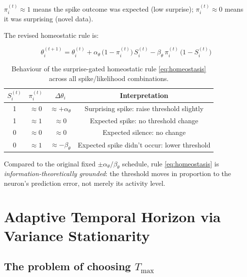 \documentclass[12pt, a4paper]{article}
\begin{document}
$\pi_i^{(t)} \approx 1$ means the spike outcome was expected (low surprise);
$\pi_i^{(t)} \approx 0$ means it was surprising (novel data).

The revised homeostatic rule is:

\begin{equation}
    \boxed{
    \theta_i^{(t+1)} = \theta_i^{(t)}
    + \alpha_\theta\,\bigl(1 - \pi_i^{(t)}\bigr)\, S_i^{(t)}
    - \beta_\theta\,\pi_i^{(t)}\,\bigl(1 - S_i^{(t)}\bigr)
    }
    \label{eq:homeostasis}
\end{equation}

\begin{table}[h]
\centering
\renewcommand{\arraystretch}{1.25}
\begin{tabular}{@{}cccc@{}}
\toprule
$S_i^{(t)}$ & $\pi_i^{(t)}$ & $\Delta\theta_i$ & \textbf{Interpretation} \\
\midrule
1 & $\approx 0$ & $\approx +\alpha_\theta$ & Surprising spike: raise threshold slightly \\
1 & $\approx 1$ & $\approx 0$             & Expected spike: no threshold change \\
0 & $\approx 0$ & $\approx 0$             & Expected silence: no change \\
0 & $\approx 1$ & $\approx -\beta_\theta$ & Expected spike didn't occur: lower threshold \\
\bottomrule
\end{tabular}
\caption{Behaviour of the surprise-gated homeostatic rule \eqref{eq:homeostasis} across
all spike/likelihood combinations.}
\label{tab:homeostasis}
\end{table}

Compared to the original fixed $\pm\alpha_\theta/\beta_\theta$ schedule, rule
\eqref{eq:homeostasis} is \emph{information-theoretically grounded}: the threshold moves
in proportion to the neuron's prediction error, not merely its activity level.

\section{Adaptive Temporal Horizon via Variance Stationarity}
\label{sec:tmax}

\subsection{The problem of choosing $T_{\max}$}
\end{document}
